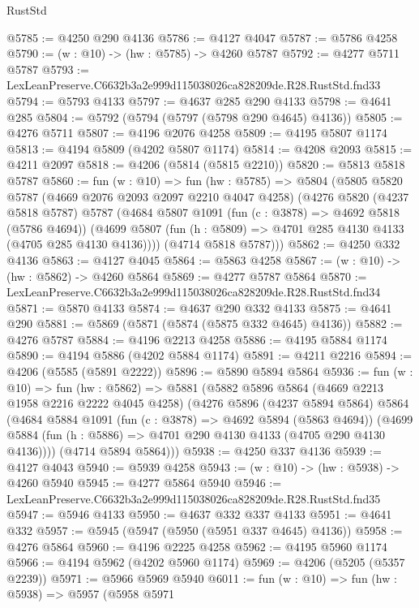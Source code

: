 \begin{lexlean}{RustStd}
\begin{coremodule}
@5785 := @4250 @290 @4136
@5786 := @4127 @4047
@5787 := @5786 @4258
@5790 := (w : @10) -> (hw : @5785) -> @4260 @5787
@5792 := @4277 @5711 @5787
@5793 := LexLeanPreserve.C6632b3a2e999d115038026ca828209de.R28.RustStd.fnd33
@5794 := @5793 @4133
@5797 := @4637 @285 @290 @4133
@5798 := @4641 @285
@5804 := @5792 (@5794 (@5797 (@5798 @290 @4645) @4136))
@5805 := @4276 @5711
@5807 := @4196 @2076 @4258
@5809 := @4195 @5807 @1174
@5813 := @4194 @5809 (@4202 @5807 @1174)
@5814 := @4208 @2093
@5815 := @4211 @2097
@5818 := @4206 (@5814 (@5815 @2210))
@5820 := @5813 @5818 @5787
@5860 := fun (w : @10) =>
  fun (hw : @5785) =>
  @5804
    (@5805
      @5820
      @5787
      (@4669 @2076 @2093 @2097 @2210 @4047 @4258)
      (@4276
        @5820
        (@4237 @5818 @5787)
        @5787
        (@4684
          @5807
          @1091
          (fun (c : @3878) => @4692 @5818 (@5786 @4694))
          (@4699 @5807 (fun (h : @5809) => @4701 @285 @4130 @4133 (@4705 @285 @4130 @4136))))
        (@4714 @5818 @5787)))
@5862 := @4250 @332 @4136
@5863 := @4127 @4045
@5864 := @5863 @4258
@5867 := (w : @10) -> (hw : @5862) -> @4260 @5864
@5869 := @4277 @5787 @5864
@5870 := LexLeanPreserve.C6632b3a2e999d115038026ca828209de.R28.RustStd.fnd34
@5871 := @5870 @4133
@5874 := @4637 @290 @332 @4133
@5875 := @4641 @290
@5881 := @5869 (@5871 (@5874 (@5875 @332 @4645) @4136))
@5882 := @4276 @5787
@5884 := @4196 @2213 @4258
@5886 := @4195 @5884 @1174
@5890 := @4194 @5886 (@4202 @5884 @1174)
@5891 := @4211 @2216
@5894 := @4206 (@5585 (@5891 @2222))
@5896 := @5890 @5894 @5864
@5936 := fun (w : @10) =>
  fun (hw : @5862) =>
  @5881
    (@5882
      @5896
      @5864
      (@4669 @2213 @1958 @2216 @2222 @4045 @4258)
      (@4276
        @5896
        (@4237 @5894 @5864)
        @5864
        (@4684
          @5884
          @1091
          (fun (c : @3878) => @4692 @5894 (@5863 @4694))
          (@4699 @5884 (fun (h : @5886) => @4701 @290 @4130 @4133 (@4705 @290 @4130 @4136))))
        (@4714 @5894 @5864)))
@5938 := @4250 @337 @4136
@5939 := @4127 @4043
@5940 := @5939 @4258
@5943 := (w : @10) -> (hw : @5938) -> @4260 @5940
@5945 := @4277 @5864 @5940
@5946 := LexLeanPreserve.C6632b3a2e999d115038026ca828209de.R28.RustStd.fnd35
@5947 := @5946 @4133
@5950 := @4637 @332 @337 @4133
@5951 := @4641 @332
@5957 := @5945 (@5947 (@5950 (@5951 @337 @4645) @4136))
@5958 := @4276 @5864
@5960 := @4196 @2225 @4258
@5962 := @4195 @5960 @1174
@5966 := @4194 @5962 (@4202 @5960 @1174)
@5969 := @4206 (@5205 (@5357 @2239))
@5971 := @5966 @5969 @5940
@6011 := fun (w : @10) =>
  fun (hw : @5938) =>
  @5957
    (@5958
      @5971

\end{coremodule}
\end{lexlean}
